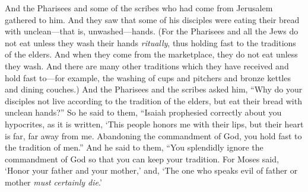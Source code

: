 \begin{biblechapter} %
 And the Pharisees and some of the scribes who had come from Jerusalem gathered to him.
\verse And they saw that some of his disciples were eating their bread with unclean—that is, unwashed—hands.
\verse (For the Pharisees and all the Jews do not eat unless they wash their hands \textit{ritually}, thus holding fast to the traditions of the elders.
\verse And when they come from the marketplace, they do not eat unless they wash. And there are many other traditions which they have received and hold fast to—for example, the washing of cups and pitchers and bronze kettles and dining couches.)
\verse And the Pharisees and the scribes asked him, “Why do your disciples not live according to the tradition of the elders, but eat their bread with unclean hands?”
\verse So he said to them, “Isaiah prophesied correctly about you hypocrites, as it is written,
\verse ‘This people honors me with their lips, 
but their heart is far, far away from me.
\verse Abandoning the commandment of God, you hold fast to the tradition of men.”
\verse And he said to them, “You splendidly ignore the commandment of God so that you can keep your tradition.
\verse For Moses said, ‘Honor your father and your mother,’ and, ‘The one who speaks evil of father or mother \textit{must certainly die}.’

\end{biblechapter}
